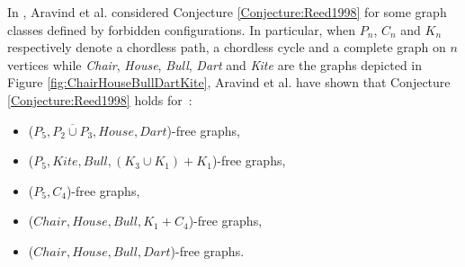 \documentclass{amsart}
\theoremstyle{definition}
\theoremstyle{remark}
\begin{document}
In \cite{AraKarSub2011}, Aravind et al. considered Conjecture \ref{Conjecture:Reed1998} for some graph classes defined by forbidden configurations.
In particular, when $P_n$, $C_n$ and $K_n$ respectively denote a chordless path, a chordless cycle and a complete graph on $n$ vertices while {\em Chair},
 {\em House}, {\em Bull}, {\em Dart} and {\em Kite} are the graphs depicted in 
Figure \ref{fig:ChairHouseBullDartKite}, Aravind et al. have shown that Conjecture \ref{Conjecture:Reed1998} holds for~:
\begin{itemize}
 \item ($P_5,\overline{P_2\cup P_3}, House, Dart$)-free graphs,
 \item ($P_5, Kite,Bull,(K_3\cup K_1)+K_1$)-free graphs,
 \item ($P_5, C_4$)-free graphs,
 \item ($Chair, House, Bull, K_1+C_4$)-free graphs,
 \item ($Chair, House, Bull, Dart$)-free graphs.
\end{itemize}
\end{document}
